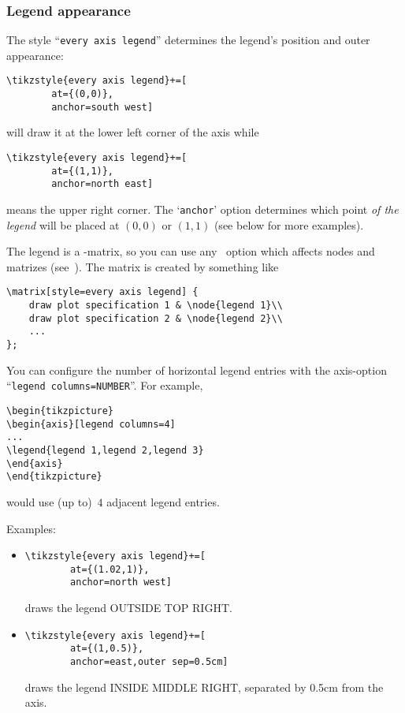 \subsubsection{Legend appearance}
The style ``\texttt{every axis legend}'' determines the legend's position and outer appearance:
\begin{lstlisting}
\tikzstyle{every axis legend}+=[
		at={(0,0)},
		anchor=south west]
\end{lstlisting}
will draw it at the lower left corner of the axis while
\begin{lstlisting}
\tikzstyle{every axis legend}+=[
		at={(1,1)},
		anchor=north east]
\end{lstlisting}
means the upper right corner. The `\texttt{anchor}' option determines which point \emph{of the legend} will be placed at $(0,0)$ or $(1,1)$ (see below for more examples).

The legend is a \Tikz-matrix, so you can use any \Tikz\ option which affects
nodes and matrizes (see~\cite[section 13~and~14]{tikz}). The matrix is created by something like
\begin{lstlisting}
\matrix[style=every axis legend] {
	draw plot specification 1 & \node{legend 1}\\
	draw plot specification 2 & \node{legend 2}\\
	...
};
\end{lstlisting}
You can configure the number of horizontal legend entries with the axis-option ``\texttt{legend columns=NUMBER}''. For example,
\begin{lstlisting}
\begin{tikzpicture}
\begin{axis}[legend columns=4]
...
\legend{legend 1,legend 2,legend 3}
\end{axis}
\end{tikzpicture}
\end{lstlisting}
would use (up to)~$4$ adjacent legend entries.

Examples:
\begin{itemize}
\item 
\begin{lstlisting}
\tikzstyle{every axis legend}+=[
		at={(1.02,1)},
		anchor=north west]
\end{lstlisting}
draws the legend OUTSIDE TOP RIGHT.

\item
\begin{lstlisting}
\tikzstyle{every axis legend}+=[
		at={(1,0.5)},
		anchor=east,outer sep=0.5cm]
\end{lstlisting}
draws the legend INSIDE MIDDLE RIGHT, separated by 0.5cm from the axis.
\end{itemize}


